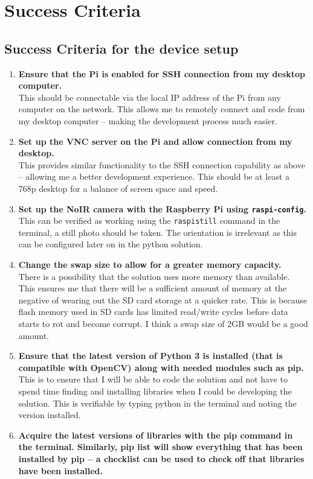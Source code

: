 \documentclass[9pt]{article}
\begin{document}
\section{Success Criteria}\label{sec_succes}

\begin{small}
	\subsection{Success Criteria for the device setup}\label{sec_device}
	\begin{enumerate}
	\setlength{\itemsep}{4pt}
	\setlength{\parskip}{0pt}
	\item \textbf{Ensure that the Pi is enabled for SSH connection from my desktop computer.}\\
		This should be connectable via the local IP address of the Pi from any computer on the network. This allows me to remotely connect and code from my desktop computer – making the development process much easier.
	\item \textbf{Set up the VNC server on the Pi and allow connection from my desktop.}\\
		This provides similar functionality to the SSH connection capability as above – allowing me a better development experience. This should be at least a 768p desktop for a balance of screen space and speed.
	\item \textbf{Set up the NoIR camera with the Raspberry Pi using \texttt{raspi-config}.}\\
		This can be verified as working using the \texttt{raspistill} command in the terminal, a still photo should be taken. The orientation is irrelevant as this can be configured later on in the python solution.
	\item \textbf{Change the swap size to allow for a greater memory capacity.}\\
		There is a possibility that the solution uses more memory than available. This ensures me that there will be a sufficient amount of memory at the negative of wearing out the SD card storage at a quicker rate. This is because flash memory used in SD cards has limited read/write cycles before data starts to rot and become corrupt. I think a swap size of 2GB would be a good amount.
	\item \textbf{Ensure that the latest version of Python 3 is installed (that is compatible with OpenCV) along with needed modules such as pip.}\\
		This is to ensure that I will be able to code the solution and not have to spend time finding and installing libraries when I could be developing the solution. This is verifiable by typing python in the terminal and noting the version installed. 
	\item \textbf{Acquire the latest versions of libraries with the pip command in the terminal. Similarly, pip list will show everything that has been installed by pip – a checklist can be used to check off that libraries have been installed.}
	\end{enumerate}
\end{small}
\end{document}
